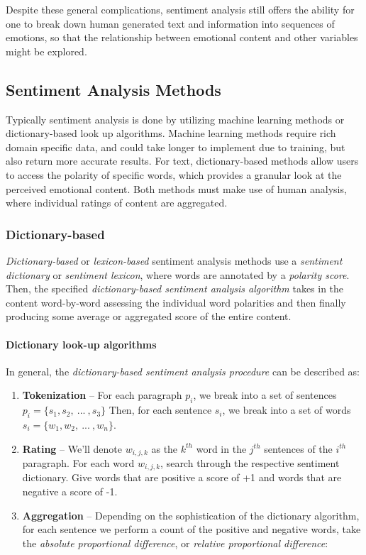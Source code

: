 Despite these general complications, sentiment analysis still offers the ability for one to break down human generated text and information into  sequences of emotions, so that the relationship between emotional content and other variables might be explored.

\subsection{Sentiment Analysis Methods}
Typically sentiment analysis is done by utilizing machine learning methods or dictionary-based look up algorithms. Machine learning methods require rich domain specific data, and could take longer to implement due to training, but also return more accurate results. For text, dictionary-based methods allow users to access the polarity of specific words, which provides a granular look at the perceived emotional content. Both methods must make use of human analysis, where individual ratings of content are aggregated. 

\subsubsection{Dictionary-based}
\textit{Dictionary-based} or \textit{lexicon-based} sentiment analysis methods use a \textit{sentiment dictionary} or \textit{sentiment lexicon}, where words are annotated by a \textit{polarity score}. 
Then, the specified \textit{dictionary-based sentiment analysis algorithm} takes in the content word-by-word assessing the individual word polarities and then finally producing some average or aggregated score of the entire content.

\paragraph{Dictionary look-up algorithms}
In general, the \textit{dictionary-based sentiment analysis procedure} can be described as:

\begin{enumerate}
\item \textbf{Tokenization }-- For each paragraph $p_i$, we break into a set of sentences $p_i = \lbrace s_1, s_2, \ ... \ , s_3 \rbrace$ Then, for each sentence $s_i$, we break into a set of words $s_i = \lbrace w_1, w_2, \ ... \ , w_n \rbrace$. 
\item \textbf{Rating} -- We'll denote $w_{i,j,k}$ as the $k^{th}$ word in the $j^{th}$ sentences of the $i^{th}$ paragraph. For each word $w_{i,j,k}$, search through the respective sentiment dictionary. Give words that are positive a score of +1 and words that are negative a score of -1.
\item \textbf{Aggregation} -- Depending on the sophistication of the dictionary algorithm, for each sentence we perform a count of the positive and negative words, take the \textit{absolute proportional difference}, or \textit{relative proportional difference}:
\end{enumerate}

